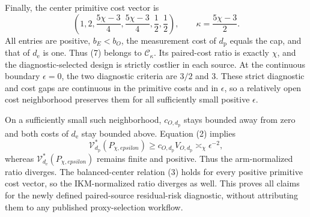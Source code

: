 Finally, the center primitive cost vector is
\[
 \left(1,2,\frac{5\chi-3}{4},\frac{5\chi-3}{4},\frac12,\frac12\right),
 \qquad \kappa=\frac{5\chi-3}{2}. \tag{7}
\]
All entries are positive, \(b_E<b_O\), the measurement cost of \(d_{\mathrm p}\) equals the cap, and that of \(d_{\mathrm e}\) is one.  Thus (7) belongs to \(\mathcal C_\kappa\).  Its paired-cost ratio is exactly \(\chi\), and the diagnostic-selected design is strictly costlier in each source.  At the continuous boundary \(\epsilon=0\), the two diagnostic criteria are \(3/2\) and \(3\).  These strict diagnostic and cost gaps are continuous in the primitive costs and in \(\epsilon\), so a relatively open cost neighborhood preserves them for all sufficiently small positive \(\epsilon\).

On a sufficiently small such neighborhood, \(c_{O,d_{\mathrm p}}\) stays bounded away from zero and both costs of \(d_{\mathrm e}\) stay bounded above.  Equation (2) implies
\[
 \mathcal V_{d_{\mathrm p}}^*(P_{\chi,epsilon})
 \ge c_{O,d_{\mathrm p}}V_{O,d_{\mathrm p}}\asymp_\chi\epsilon^{-2},
\]
whereas \(\mathcal V_{d_{\mathrm e}}^*(P_{\chi,epsilon})\) remains finite and positive.  Thus the arm-normalized ratio diverges.  The balanced-center relation (3) holds for every positive primitive cost vector, so the IKM-normalized ratio diverges as well.  This proves all claims for the newly defined paired-source residual-risk diagnostic, without attributing them to any published proxy-selection workflow.